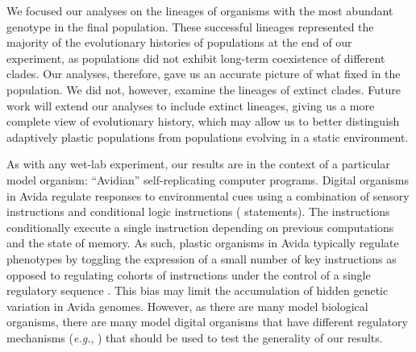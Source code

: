 We focused our analyses on the lineages of organisms with the most abundant genotype in the final population.
These successful lineages represented the majority of the evolutionary histories of populations at the end of our experiment, as populations did not exhibit long-term coexistence of different clades.
Our analyses, therefore, gave us an accurate picture of what fixed in the population.
We did not, however, examine the lineages of extinct clades.
Future work will extend our analyses to include extinct lineages, giving us a more complete view of evolutionary history, which may allow us to better distinguish adaptively plastic populations from populations evolving in a static environment. 

As with any wet-lab experiment, our results are in the context of a particular model organism: ``Avidian'' self-replicating computer programs.
Digital organisms in Avida regulate responses to environmental cues using a combination of sensory instructions and conditional logic instructions ( statements).
The  instructions conditionally execute a single instruction depending on previous computations and the state of memory. 
As such, plastic organisms in Avida typically regulate phenotypes by toggling the expression of a small number of key instructions as opposed to regulating cohorts of instructions under the control of a single regulatory sequence \citep{supplemental_material}. 
This bias may limit the accumulation of hidden genetic variation in Avida genomes. 
However, as there are many model biological organisms, there are many model digital organisms that have different regulatory mechanisms (\textit{e.g.}, \citealt{lalejini_evolving_2018}) that should be used to test the generality of our results.


